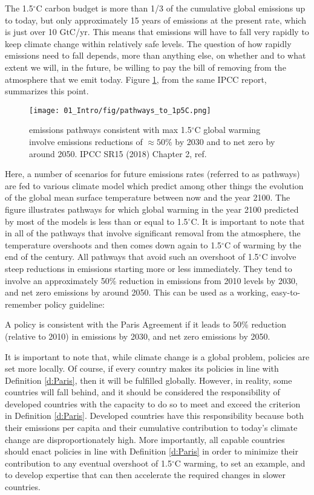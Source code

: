 The 1.5$^\circ$C carbon budget is more than 1/3 of the cumulative global emissions up to today, but only approximately 15 years of emissions at the present rate, which is just over 10 GtC/yr\cite{LeQuere2018}. This means that emissions will have to fall very rapidly to keep climate change within relatively safe levels. The question of how rapidly emissions need to fall depends, more than anything else, on whether and to what extent we will, in the future, be willing to pay the bill of removing  from the atmosphere that we emit today. Figure \ref{fig:paths}, from the same IPCC report, summarizes this point. 
\begin{figure}[h!]
	\centering
	\texttt{[image: 01\_Intro/fig/pathways\_to\_1p5C.png]}
	\caption{ emissions pathways consistent with max 1.5$^\circ$C global warming involve emissions reductions of $\approx 50$\% by 2030 and to net zero by around 2050. IPCC SR15 (2018) Chapter 2, ref. \cite{IPCC2018_ch2}}
	\label{fig:paths}
\end{figure}

Here, a number of scenarios for future emissions rates (referred to as pathways) are fed to various climate model which predict among other things the evolution of the global mean surface temperature between now and the year 2100. The figure illustrates pathways for which global warming in the year 2100 predicted by most of the models is less than or equal to 1.5$^\circ$C. It is important to note that in all of the pathways that involve significant  removal from the atmosphere, the temperature overshoots and then comes down again to 1.5$^\circ$C of warming by the end of the century. All pathways that avoid such an overshoot of 1.5$^\circ$C involve steep reductions in emissions starting more or less immediately. They tend to involve an approximately 50\% reduction in  emissions from 2010 levels by 2030, and net zero emissions by around 2050\cite{IPCC2018_ch2}. This can be used as a working, easy-to-remember policy guideline:
\begin{definition}
A policy is consistent with the Paris Agreement if it leads to 50\% reduction (relative to 2010) in  emissions by 2030, and net zero emissions by 2050. \label{d:Paris}
\end{definition}

It is important to note that, while climate change is a global problem, policies are set more locally. Of course, if every country makes its policies in line with Definition \ref{d:Paris}, then it will be fulfilled globally. However, in reality, some countries will fall behind, and it should be considered the responsibility of developed countries with the capacity to do so to meet and exceed the criterion in Definition \ref{d:Paris}. Developed countries have this responsibility because both their emissions per capita and their cumulative contribution to today's climate change are disproportionately high\cite{Ritchie2019a}. More importantly, all capable countries should enact policies in line with Definition \ref{d:Paris} in order to minimize their contribution to any eventual overshoot of 1.5$^\circ$C warming, to set an example, and to develop expertise that can then accelerate the required changes in slower countries.

